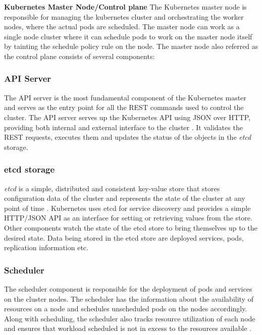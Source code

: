 \documentclass[9pt,twocolumn,twoside]{../../styles/osajnl}
\begin{document}
\textbf{Kubernetes Master Node/Control plane}
\newline
The Kubernetes master node is responsible for managing the kubernetes
cluster and orchestrating the worker nodes, where the actual pods are
scheduled. The master node can work as a single node cluster where it
can schedule pods to work on the master node itself by tainting the
schedule policy rule on the node. The master node also referred as
the control plane consists of several components:

\subsubsection{API Server}
The API server is the most fundamental component of the Kubernetes
master and serves as the entry point for all the REST commands used to
control the cluster. The API server serves up the Kubernetes API using
JSON over HTTP, providing both internal and external interface to the
cluster \cite{www-kubernetes-digitalocean} \cite{www-apiserver-kmblog}. It validates the REST requests, executes
them and updates the status of the objects in the \emph{etcd} storage.

\subsubsection{etcd storage}
\emph{etcd} is a simple, distributed and consistent key-value store
that stores configuration data of the cluster and represents the state
of the cluster at any point of time \cite{www-wiki-kubernetes}. Kubernetes uses etcd for
service discovery and provides a simple HTTP/JSON API as an interface
for setting or retrieving values from the store. Other components
watch the state of the etcd store to bring themselves up to the
desired state. Data being stored in the etcd store are deployed
services, pods, replication information etc.

\subsubsection{Scheduler}
The scheduler component is responsible for the deployment of pods and
services on the cluster nodes. The scheduler has the information about
the availability of resources on a node and schedules unscheduled pods
on the nodes accordingly. Along with scheduling, the scheduler also
tracks resource utilization of each node and ensures that workload
scheduled is not in excess to the resources available \cite{www-wiki-kubernetes}.
\end{document}
